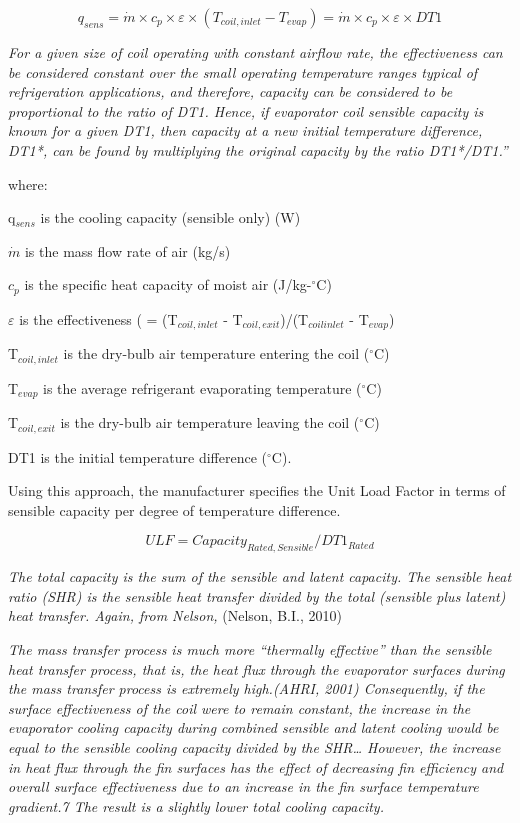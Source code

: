 \begin{equation}
{q_{sens}} = \dot m \times {c_p} \times \varepsilon  \times ({T_{coil,inlet}} - {T_{evap}}) = \dot m \times {c_p} \times \varepsilon \times DT1
\end{equation}

\emph{For a given size of coil operating with constant airflow rate, the effectiveness can be considered constant over the small operating temperature ranges typical of refrigeration applications, and therefore, capacity can be considered to be proportional to the ratio of DT1. Hence, if evaporator coil sensible capacity is known for a given DT1, then capacity at a new initial temperature difference, DT1*, can be found by multiplying the original capacity by the ratio DT1*/DT1.''}

where:

q\(_{sens}\) is the cooling capacity (sensible only) (W)

\(\dot m\) is the mass flow rate of air (kg/s)

\({c_p}\) is the specific heat capacity of moist air (J/kg-\(^{\circ}\)C)

\(\varepsilon\) is the effectiveness ( = (T\(_{coil,inlet}\) - T\(_{coil,exit}\))/(T\(_{coilinlet}\) - T\(_{evap}\))

T\(_{coil,inlet}\) is the dry-bulb air temperature entering the coil (\(^{\circ}\)C)

T\(_{evap}\) is the average refrigerant evaporating temperature (\(^{\circ}\)C)

T\(_{coil,exit}\) is the dry-bulb air temperature leaving the coil (\(^{\circ}\)C)

DT1 is the initial temperature difference (\(^{\circ}\)C).

Using this approach, the manufacturer specifies the Unit Load Factor in terms of sensible capacity per degree of temperature difference.

\begin{equation}
ULF = Capacit{y_{Rated,Sensible}}/DT{1_{Rated}}
\end{equation}

\emph{The total capacity is the sum of the sensible and latent capacity. The sensible heat ratio (SHR) is the sensible heat transfer divided by the total (sensible plus latent) heat transfer. Again, from Nelson,} (Nelson, B.I., 2010)

\emph{The mass transfer process is much more ``thermally effective'' than the sensible heat transfer process, that is, the heat flux through the evaporator surfaces during the mass transfer process is extremely high.(AHRI, 2001) Consequently, if the surface effectiveness of the coil were to remain constant, the increase in the evaporator cooling capacity during combined sensible and latent cooling would be equal to the sensible cooling capacity divided by the SHR\ldots{} However, the increase in heat flux through the fin surfaces has the effect of decreasing fin efficiency and overall surface effectiveness due to an increase in the fin surface temperature gradient.7 The result is a slightly lower total cooling capacity.}

